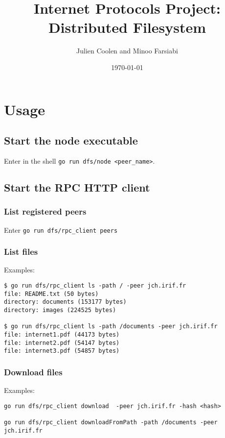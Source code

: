 \documentclass[12pt,a4paper]{article}
\title{Internet Protocols Project: Distributed Filesystem}
\author{Julien Coolen and Minoo Farsiabi}
\date{\today}
\begin{document}
\maketitle


\tableofcontents
\pagebreak

\section{Usage}

\subsection{Start the node executable}
Enter in the shell \texttt{go run dfs/node <peer\_name>}.

\subsection{Start the RPC HTTP client}

\subsubsection{List registered peers}
Enter \texttt{go run dfs/rpc\_client peers}

\subsubsection{List files}


Examples:
\begin{Verbatim}[breaklines=true, breakanywhere=true]
$ go run dfs/rpc_client ls -path / -peer jch.irif.fr
file: README.txt (50 bytes)
directory: documents (153177 bytes)
directory: images (224525 bytes)

$ go run dfs/rpc_client ls -path /documents -peer jch.irif.fr
file: internet1.pdf (44173 bytes)
file: internet2.pdf (54147 bytes)
file: internet3.pdf (54857 bytes)
\end{Verbatim}

\subsubsection{Download files}
Examples:

\begin{Verbatim}[breaklines=true, breakanywhere=true]
go run dfs/rpc_client download  -peer jch.irif.fr -hash <hash>

go run dfs/rpc_client downloadFromPath -path /documents -peer jch.irif.fr
\end{Verbatim}
\end{document}
